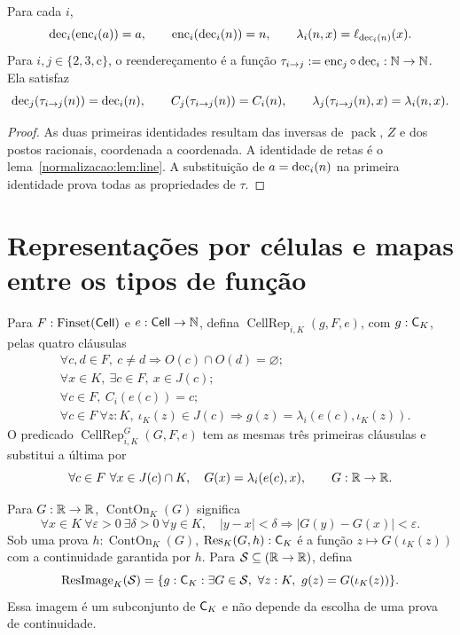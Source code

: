 \begin{lema}\label{map:normalizacao:4.7}\label{normalizacao:lem:codec}
Para cada $i$,
\[
 \operatorname{dec}_i(\operatorname{enc}_i(a))=a,\qquad \operatorname{enc}_i(\operatorname{dec}_i(n))=n,
 \qquad\lambda_i(n,x)=\ell_{\operatorname{dec}_i(n)}(x).
\]
Para $i,j\in\{2,3,\mathrm c\}$, o reendereçamento é a função
$\tau_{i\to j}:=\operatorname{enc}_j\circ\operatorname{dec}_i:\mathbb N\to\mathbb N$. Ela satisfaz
\[
 \operatorname{dec}_j(\tau_{i\to j}(n))=\operatorname{dec}_i(n),\qquad
 C_j(\tau_{i\to j}(n))=C_i(n),\qquad
 \lambda_j(\tau_{i\to j}(n),x)=\lambda_i(n,x).
\]
\end{lema}
\begin{proof}
As duas primeiras identidades resultam das inversas de
$\operatorname{pack}$, $Z$ e dos postos racionais, coordenada a
coordenada. A identidade de retas é o lema~\ref{normalizacao:lem:line}.
A substituição de $a=\operatorname{dec}_i(n)$ na primeira identidade prova todas as
propriedades de $\tau$.
\end{proof}

\section{Representações por células e mapas entre os tipos de função}
\label{normalizacao:sec:bridge}

\begin{definicao}\label{map:normalizacao:5.1}\label{normalizacao:def:cellrep}
Para $F:\operatorname{Finset}(\mathsf{Cell})$ e $e:\mathsf{Cell}\to\mathbb N$, defina
$\operatorname{CellRep}_{i,K}(g,F,e)$, com $g:\mathsf C_K$, pelas quatro
cláusulas
\begin{align*}
 &\forall c,d\in F,\ c\ne d\Rightarrow O(c)\cap O(d)=\varnothing;\\
 &\forall x\in K,\ \exists c\in F,\ x\in J(c);\\
 &\forall c\in F,\ C_i(e(c))=c;\\
 &\forall c\in F\ \forall z:K,\ \iota_K(z)\in J(c)
       \Rightarrow g(z)=\lambda_i(e(c),\iota_K(z)).
\end{align*}
O predicado $\operatorname{CellRep}^G_{i,K}(G,F,e)$ tem as mesmas
três primeiras cláusulas e substitui a última por
\[
 \forall c\in F\ \forall x\in J(c)\cap K,\quad
 G(x)=\lambda_i(e(c),x),\qquad G:\mathbb R\to\mathbb R.
\]
\end{definicao}

\begin{definicao}\label{map:normalizacao:5.2}\label{normalizacao:def:restriction}
Para $G:\mathbb R\to\mathbb R$, $\operatorname{ContOn}_K(G)$ significa
\[
 \forall x\in K\ \forall\varepsilon>0\ \exists\delta>0\
 \forall y\in K,\quad |y-x|<\delta\Rightarrow
                         |G(y)-G(x)|<\varepsilon.
\]
Sob uma prova $h:\operatorname{ContOn}_K(G)$,
$\operatorname{Res}_K(G,h):\mathsf C_K$ é a função $z\mapsto G(\iota_K(z))$ com a
continuidade garantida por $h$.
Para $\mathcal S\subseteq(\mathbb R\to\mathbb R)$, defina
\[
 \operatorname{ResImage}_K(\mathcal S)=
 \{g:\mathsf C_K:\exists G\in\mathcal S,\
             \forall z:K,\ g(z)=G(\iota_K(z))\}.
\]
Essa imagem é um subconjunto de $\mathsf C_K$ e não depende da escolha
de uma prova de continuidade.
\end{definicao}

